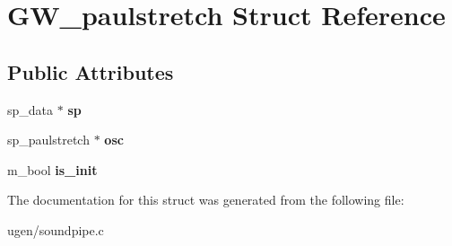 \hypertarget{structGW__paulstretch}{}\section{G\+W\+\_\+paulstretch Struct Reference}
\label{structGW__paulstretch}
\subsection*{Public Attributes}
\begin{DoxyCompactItemize}
\item 
\hypertarget{structGW__paulstretch_a66b5d5940a26746e2e56f1c9c9a1a35a}{}\label{structGW__paulstretch_a66b5d5940a26746e2e56f1c9c9a1a35a} 
sp\+\_\+data $\ast$ {\bfseries sp}
\item 
\hypertarget{structGW__paulstretch_aefe2e3483b21ac088cfb1bcf7d1914e2}{}\label{structGW__paulstretch_aefe2e3483b21ac088cfb1bcf7d1914e2} 
sp\+\_\+paulstretch $\ast$ {\bfseries osc}
\item 
\hypertarget{structGW__paulstretch_a1d38a6a1b663bd8855d04d1ebdb39068}{}\label{structGW__paulstretch_a1d38a6a1b663bd8855d04d1ebdb39068} 
m\+\_\+bool {\bfseries is\+\_\+init}
\end{DoxyCompactItemize}


The documentation for this struct was generated from the following file\+:\begin{DoxyCompactItemize}
\item 
ugen/soundpipe.\+c\end{DoxyCompactItemize}
